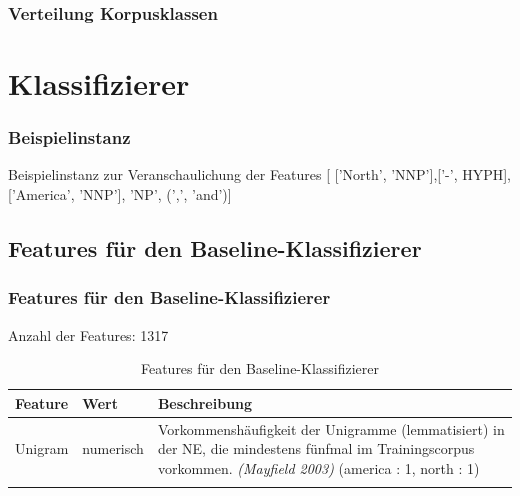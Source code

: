 \documentclass{beamer}
\begin{document}
	\begin{frame}
			\frametitle{Verteilung Korpusklassen}
			 \begin{table}
			 	\caption{Verteilung der Klassen nach Balancierung}
			 	\label{tab:datasets}
			 \end{table}
	\end{frame}


\section{Klassifizierer}
	\begin{frame}
		\frametitle{Beispielinstanz}
		\begin{exampleblock}{Beispielinstanz zur Veranschaulichung der Features}
		[ ['North', 'NNP'],['-', HYPH], ['America', 'NNP'], 'NP', (',', 'and')]
	\end{exampleblock}
		
	\end{frame}
	\subsection{Features für den Baseline-Klassifizierer}
	\begin{frame}
		\frametitle{Features für den Baseline-Klassifizierer}
		Anzahl der Features: 1317
					 \begin{table}
					 	\small
					 	\caption{Features für den Baseline-Klassifizierer}
					 	\begin{tabularx}{\textwidth}{llX}
					 		\toprule
							Feature & Wert & Beschreibung\\
					 		\midrule
					 		Unigram & numerisch & Vorkommenshäufigkeit der Unigramme (lemmatisiert) in der NE, die mindestens fünfmal im Trainingscorpus vorkommen. \textit{(Mayfield 2003)} \color{red}(america : 1, north : 1)\\ \\
					 		\bottomrule
					 	\end{tabularx}
					 	\label{tab:baselinef}
					 \end{table}
	\end{frame}
\end{document}
